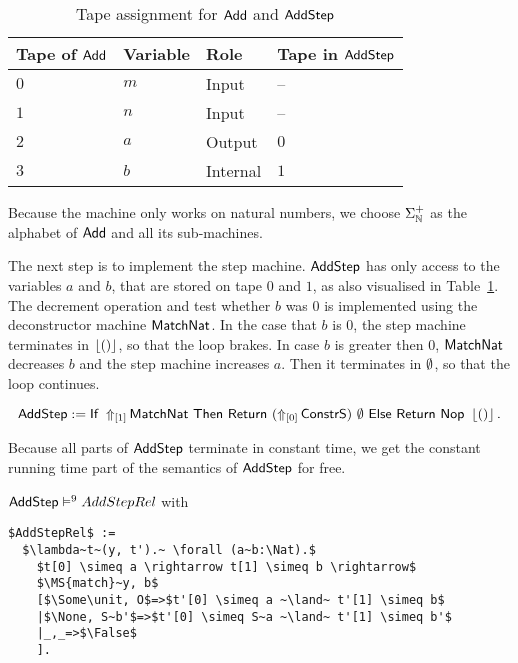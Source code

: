 \begin{table}[h]
  \centering
  \begin{tabular}{l|l|l|l}
     Tape of $\MS{Add}$ & Variable & Role      & Tape in $\MS{AddStep}$ \\ \hline
     $0$                & $m$      & Input     & --                     \\
     $1$                & $n$      & Input     & --                     \\
     $2$                & $a$      & Output    & $0$                    \\
     $3$                & $b$      & Internal  & $1$                    \\
  \end{tabular}
  \caption{Tape assignment for $\MS{Add}$ and $\MS{AddStep}$}
  \label{tab:tapes-Add}
\end{table}

Because the machine only works on natural numbers, we choose $\Sigma_\Nat^+$ as the alphabet of $\MS{Add}$ and all its sub-machines.

The next step is to implement the step machine.  $\MS{AddStep}$ has only access to the variables $a$ and $b$, that are stored on tape $0$ and $1$, as
also visualised in Table~\ref{tab:tapes-Add}.  The decrement operation and test whether $b$ was $0$ is implemented using the deconstructor machine
$\MS{MatchNat}$.  In the case that $b$ is $0$, the step machine terminates in $\Some\unit$, so that the loop brakes.  In case $b$ is greater then $0$,
$\MS{MatchNat}$ decreases $b$ and the step machine increases $a$.  Then it terminates in $\None$, so that the loop continues.
\begin{definition}
  \label{def:Add_Step}
  \[
    \MS{AddStep} := \If{\LiftTapes{\MS{MatchNat}}{\Vector{1}}}{\Return{(\LiftTapes{\MS{ConstrS}}{\Vector{0}})}{\None}}{\Return{\Nop}{\Some\unit}}.
  \]
\end{definition}

Because all parts of $\MS{AddStep}$ terminate in constant time, we get the constant running time part of the semantics of $\MS{AddStep}$ for free.
\begin{lemma}
  \label{lem:Add_Step_Sem}
  $\MS{AddStep} \RealiseIn{9} AddStepRel$ with
\begin{lstlisting}[style=semicoqstyle]
$AddStepRel$ :=
  $\lambda~t~(y, t').~ \forall (a~b:\Nat).$
    $t[0] \simeq a \rightarrow t[1] \simeq b \rightarrow$
    $\MS{match}~y, b$
    [$\Some\unit, O$=>$t'[0] \simeq a ~\land~ t'[1] \simeq b$
    |$\None, S~b'$=>$t'[0] \simeq S~a ~\land~ t'[1] \simeq b'$
    |_,_=>$\False$
    ].
\end{lstlisting}
\end{lemma}

